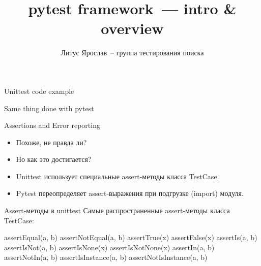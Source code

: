 \documentclass{beamer}
\title{pytest framework~--- intro \& overview}
\author{Литус Ярослав~-- группа тестирования поиска}
\institute{ООО <<ПП~Спутник>>}
\begin{document}
\begin{frame}
    \titlepage
\end{frame}


\begin{frame}[fragile]{Unittest code example}
\end{frame}

\begin{frame}[fragile]{Same thing done with pytest}
\end{frame}

\begin{frame}[fragile]{Assertions and Error reporting}
    \begin{itemize}
    \item<3->{Похоже, не правда ли?}
    \item<4->{Но как это достигается?}
    \item<5->{Unittest использует специальные assert-методы класса TestCase.}
    \item<6->{Pytest переопределяет assert-выражения при подгрузке (import) модуля.}
    \end{itemize}
\end{frame}

\begin{frame}[fragile]{Assert-методы в unittest}
    Самые распространенные assert-методы класса TestCase:
    \begin{pycode}
        assertEqual(a, b)
        assertNotEqual(a, b)
        assertTrue(x)
        assertFalse(x)
        assertIs(a, b)
        assertIsNot(a, b)
        assertIsNone(x)
        assertIsNotNone(x)
        assertIn(a, b)
        assertNotIn(a, b)
        assertIsInstance(a, b)
        assertNotIsInstance(a, b)
    \end{pycode}
\end{frame}
\end{document}
